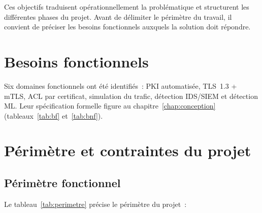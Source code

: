 Ces objectifs traduisent opérationnellement la problématique et structurent les différentes phases du projet. Avant de délimiter le périmètre du travail, il convient de préciser les besoins fonctionnels auxquels la solution doit répondre.

\section{Besoins fonctionnels}
\label{sec:besoins-fonctionnels-ch1}

Six domaines fonctionnels ont été identifiés~: PKI automatisée, TLS~1.3 + mTLS, ACL par certificat, simulation du trafic, détection IDS/SIEM et détection ML. Leur spécification formelle figure au chapitre~\ref{chap:conception} (tableaux~\ref{tab:bf} et~\ref{tab:bnf}).

\section{Périmètre et contraintes du projet}
\label{sec:perimetre}

\subsection{Périmètre fonctionnel}

Le tableau~\ref{tab:perimetre} précise le périmètre du projet~:

